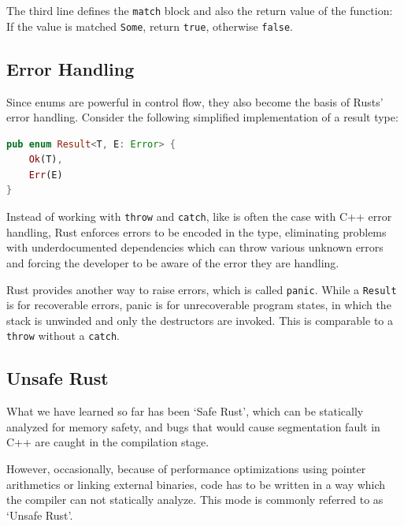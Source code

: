 \documentclass[11pt,
               a4paper,
               bibtotoc,
               idxtotoc,
               headsepline,
               footsepline,
               footexclude,
               BCOR12mm,
               DIV13,
               openany,   %
               ]
               {scrbook}
\begin{document}
The third line defines the \texttt{match} block and also the return value of the function: If the value is matched \texttt{Some}, return \texttt{true}, otherwise \texttt{false}.

\subsection{Error Handling}

Since enums are powerful in control flow, they also become the basis of Rusts' error handling. Consider the following simplified implementation of a result type:

\vspace{0.5em}
\begin{lstlisting}[style=eclipse-rust, language=Rust, basicstyle=\ttfamily\small, caption={The result type in Rust (Note: The `\texttt{: Error}' syntax is a trait bound requiring the generic type to implement the \texttt{Error} trait).}, label=code:rust-result]
pub enum Result<T, E: Error> {
    Ok(T),
    Err(E)
}
\end{lstlisting}

Instead of working with \texttt{throw} and \texttt{catch}, like is often the case with C++ error handling, Rust enforces errors to be encoded in the type, eliminating problems with underdocumented dependencies which can throw various unknown errors and forcing the developer to be aware of the error they are handling.


Rust provides another way to raise errors, which is called \texttt{panic}. While a \texttt{Result} is for recoverable errors, panic is for unrecoverable program states, in which the stack is unwinded and only the destructors are invoked. This is comparable to a \texttt{throw} without a \texttt{catch}.

\subsection{Unsafe Rust}

What we have learned so far has been `Safe Rust', which can be statically analyzed for memory safety, and bugs that would cause segmentation fault in C++ are caught in the compilation stage.

However, occasionally, because of performance optimizations using pointer arithmetics or linking external binaries, code has to be written in a way which the compiler can not statically analyze. This mode is commonly referred to as `Unsafe Rust'.
\end{document}
